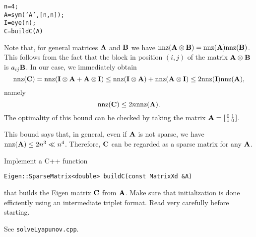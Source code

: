 \begin{problem}
\begin{subproblem}[4]
\begin{hint}
\texttt{n=4; \\
A=sym('A',[n,n]); \\
I=eye(n); \\
C=buildC(A)}
\end{hint}
\begin{solution}
Note that, for general matrices ${\mathbf{A}}$ and ${\mathbf{B}}$ we have ${\rm nnz}({\mathbf{A}}\otimes {\mathbf{B}})={\rm nnz}({\mathbf{A}}){\rm nnz}({\mathbf{B}})$. This follows from the fact that the block in position $(i,j)$ of the matrix ${\mathbf{A}}\otimes {\mathbf{B}}$ is $a_{ij}{\mathbf{B}}$. In our case, we immediately obtain
\[
{\rm nnz}({\mathbf{C}})={\rm nnz}(\mathbf{I}\otimes
  \mathbf{A}+\mathbf{A}\otimes \mathbf{I})\le {\rm nnz}(\mathbf{I}\otimes
  \mathbf{A}) +{\rm nnz}(\mathbf{A}\otimes \mathbf{I})\le 2 {\rm nnz}({\mathbf{I}}){\rm nnz}({\mathbf{A}}),
\]
namely
\[
{\rm nnz}({\mathbf{C}})\le 2n {\rm nnz}({\mathbf{A}}).
\]
The optimality of this bound can be checked by taking the matrix ${\mathbf{A}}=\left[ \begin{smallmatrix} 0 & 1 \\ 1 & 0 \end{smallmatrix} \right]$.

This bound says that, in general, even if ${\mathbf{A}}$ is not sparse, we have  ${\rm nnz}({\mathbf{A}})\le 2 n^3 \ll n^4$. Therefore, ${\mathbf{C}}$ can be regarded as a sparse matrix for any ${\mathbf{A}}$.
\end{solution}
\end{subproblem}

\begin{subproblem}[3]
Implement a C++ function

\texttt{Eigen::SparseMatrix<double> buildC(const MatrixXd \&A)}

that builds the Eigen matrix ${\mathbf{C}}$ from ${\mathbf{A}}$. Make sure that initialization is done efficiently using an intermediate triplet format. Read  very carefully before starting.
\begin{solution}
See \texttt{solveLyapunov.cpp}.
\end{solution}
\end{subproblem}


\end{problem}

